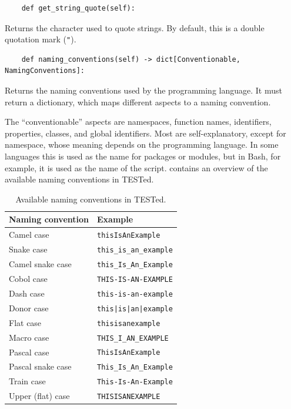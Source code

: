 \documentclass[../main]{subfiles}
\begin{document}
\begin{verbatim}
    def get_string_quote(self):
\end{verbatim}

Returns the character used to quote strings.
By default, this is a double quotation mark (\texttt{"}).

\begin{verbatim}
    def naming_conventions(self) -> dict[Conventionable, NamingConventions]:
\end{verbatim}

Returns the naming conventions used by the programming language.
It must return a dictionary, which maps different aspects to a naming convention.

The ``conventionable'' aspects are namespaces, function names, identifiers, properties, classes, and global identifiers.
Most are self-explanatory, except for namespace, whose meaning depends on the programming language.
In some languages this is used as the name for packages or modules, but in Bash, for example, it is used as the name of the script.
 contains an overview of the available naming conventions in TESTed.

\begin{table}[h]
    \centering
    \caption{Available naming conventions in TESTed.}
    \label{tab:naming-conventions}
    \begin{tabular}{|l|l|}
        \hline
        Naming convention & Example \\
        \hline
        Camel case & \texttt{thisIsAnExample}  \\
        Snake case & \texttt{this\_is\_an\_example} \\
        Camel snake case & \texttt{this\_Is\_An\_Example} \\
        Cobol case & \texttt{THIS-IS-AN-EXAMPLE} \\
        Dash case & \texttt{this-is-an-example} \\
        Donor case & \texttt{this|is|an|example} \\
        Flat case & \texttt{thisisanexample} \\
        Macro case & \texttt{THIS\_I\_AN\_EXAMPLE} \\
        Pascal case & \texttt{ThisIsAnExample} \\
        Pascal snake case & \texttt{This\_Is\_An\_Example} \\
        Train case & \texttt{This-Is-An-Example} \\
        Upper (flat) case & \texttt{THISISANEXAMPLE} \\
        \hline
    \end{tabular}
\end{table}
\end{document}
